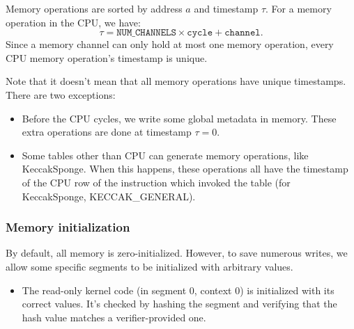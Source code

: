 Memory operations are sorted by address $a$ and timestamp $\tau$. For a memory operation in the CPU, we have:
$$\tau = \texttt{NUM\_CHANNELS} \times \texttt{cycle} + \texttt{channel}.$$
Since a memory channel can only hold at most one memory operation, every CPU memory operation's timestamp is unique.

Note that it doesn't mean that all memory operations have unique timestamps. There are two exceptions:

\begin{itemize}
  \item Before the CPU cycles, we write some global metadata in memory. These extra operations are done at timestamp $\tau = 0$.
  \item Some tables other than CPU can generate memory operations, like KeccakSponge. When this happens, these operations all have the timestamp of the CPU row of the instruction which invoked the table (for KeccakSponge, KECCAK\_GENERAL).
\end{itemize}

\subsubsection{Memory initialization}

By default, all memory is zero-initialized. However, to save numerous writes, we allow some specific segments to be initialized with arbitrary values.

\begin{itemize}
  \item The read-only kernel code (in segment 0, context 0) is initialized with its correct values. It's checked by hashing the segment and verifying
that the hash value matches a verifier-provided one.
\end{itemize}
